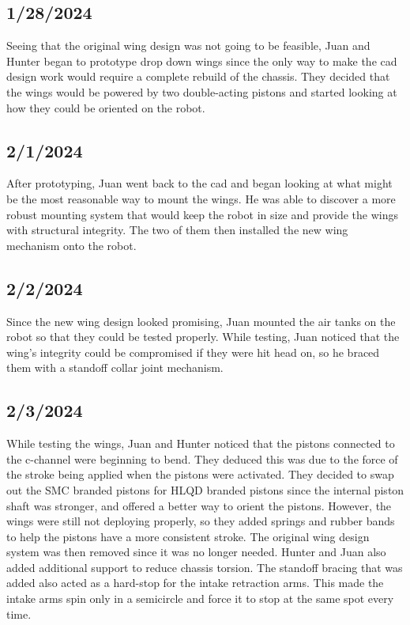 \subsection{1/28/2024}
Seeing that the original wing design was not going to be feasible, Juan and Hunter began to prototype drop down wings
since the only way to make the cad design work would require a complete rebuild of the chassis. They decided that the
wings would be powered by two double-acting pistons and started looking at how they could be oriented on the robot.

\subsection{2/1/2024}
After prototyping, Juan went back to the cad and began looking at what might be the most reasonable way to mount the wings.
He was able to discover a more robust mounting system that would keep the robot in size and provide the wings with structural
integrity. The two of them then installed the new wing mechanism onto the robot.


\subsection{2/2/2024}
Since the new wing design looked promising, Juan mounted the air tanks on the robot so that they could be tested properly.
While testing, Juan noticed that the wing's integrity could be compromised if they were hit head on, so he braced them 
with a standoff collar joint mechanism.


\subsection{2/3/2024}
While testing the wings, Juan and Hunter noticed that the pistons connected to the c-channel were beginning to bend.
They deduced this was due to the force of the stroke being applied when the pistons were activated. They decided to swap
out the SMC branded pistons for HLQD branded pistons since the internal piston shaft was stronger, and offered a better way 
to orient the pistons. However, the wings were still not deploying properly, so they added springs and rubber bands to help
the pistons have a more consistent stroke. The original wing design system was then removed since it was no longer needed.
Hunter and Juan also added additional support to reduce chassis torsion. The standoff bracing that was added also acted as a 
hard-stop for the intake retraction arms. This made the intake arms spin only in a semicircle and force it to stop at the
same spot every time.

